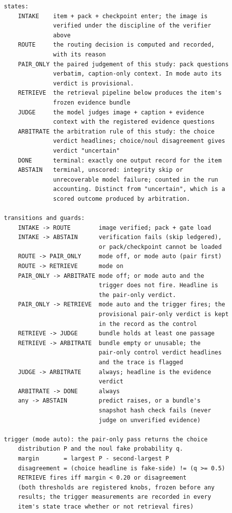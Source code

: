 \documentclass{article} %
\begin{document}
{\footnotesize\begin{verbatim}
states:
    INTAKE    item + pack + checkpoint enter; the image is
              verified under the discipline of the verifier
              above
    ROUTE     the routing decision is computed and recorded,
              with its reason
    PAIR_ONLY the paired judgement of this study: pack questions
              verbatim, caption-only context. In mode auto its
              verdict is provisional.
    RETRIEVE  the retrieval pipeline below produces the item's
              frozen evidence bundle
    JUDGE     the model judges image + caption + evidence
              context with the registered evidence questions
    ARBITRATE the arbitration rule of this study: the choice
              verdict headlines; choice/noul disagreement gives
              verdict "uncertain"
    DONE      terminal: exactly one output record for the item
    ABSTAIN   terminal, unscored: integrity skip or
              unrecoverable model failure; counted in the run
              accounting. Distinct from "uncertain", which is a
              scored outcome produced by arbitration.

transitions and guards:
    INTAKE -> ROUTE        image verified; pack + gate load
    INTAKE -> ABSTAIN      verification fails (skip ledgered),
                           or pack/checkpoint cannot be loaded
    ROUTE -> PAIR_ONLY     mode off, or mode auto (pair first)
    ROUTE -> RETRIEVE      mode on
    PAIR_ONLY -> ARBITRATE mode off; or mode auto and the
                           trigger does not fire. Headline is
                           the pair-only verdict.
    PAIR_ONLY -> RETRIEVE  mode auto and the trigger fires; the
                           provisional pair-only verdict is kept
                           in the record as the control
    RETRIEVE -> JUDGE      bundle holds at least one passage
    RETRIEVE -> ARBITRATE  bundle empty or unusable; the
                           pair-only control verdict headlines
                           and the trace is flagged
    JUDGE -> ARBITRATE     always; headline is the evidence
                           verdict
    ARBITRATE -> DONE      always
    any -> ABSTAIN         predict raises, or a bundle's
                           snapshot hash check fails (never
                           judge on unverified evidence)

trigger (mode auto): the pair-only pass returns the choice
    distribution P and the noul fake probability q.
    margin       = largest P - second-largest P
    disagreement = (choice headline is fake-side) != (q >= 0.5)
    RETRIEVE fires iff margin < 0.20 or disagreement
    (both thresholds are registered knobs, frozen before any
    results; the trigger measurements are recorded in every
    item's state trace whether or not retrieval fires)


\end{verbatim}}
\end{document}
